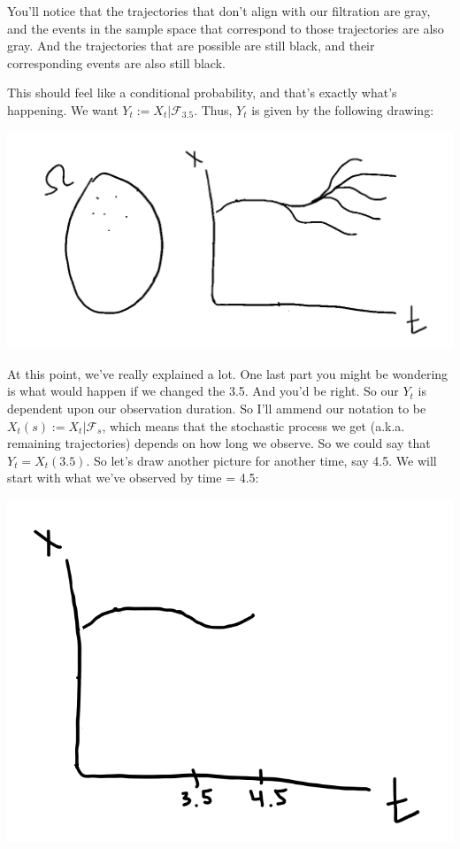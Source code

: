 \documentclass{article}
\begin{document}
You'll notice that the trajectories that don't align with our filtration are gray, and the events in the sample space that correspond to those trajectories are also gray.  And the trajectories that are possible are still black, and their corresponding events are also still black.

This should feel like a conditional probability, and that's exactly what's happening. We want $Y_t := X_t | \mathcal{F}_{3.5}$.  Thus, $Y_t$ is given by the following drawing:

\includegraphics[width=\textwidth]{filtration_part_4.png}

At this point, we've really explained a lot.  One last part you might be wondering is what would happen if we changed the 3.5.  And you'd be right. So our $Y_t$ is dependent upon our observation duration. So I'll ammend our notation to be $X_t(s) := X_t | \mathcal{F}_{s}$, which means that the stochastic process we get (a.k.a. remaining trajectories) depends on how long we observe.  So we could say that $Y_t = X_t(3.5)$.  So let's draw another picture for another time, say 4.5. We will start with what we've observed by time = 4.5:

\includegraphics[width=\textwidth]{filtration_4.5.png}
\end{document}
